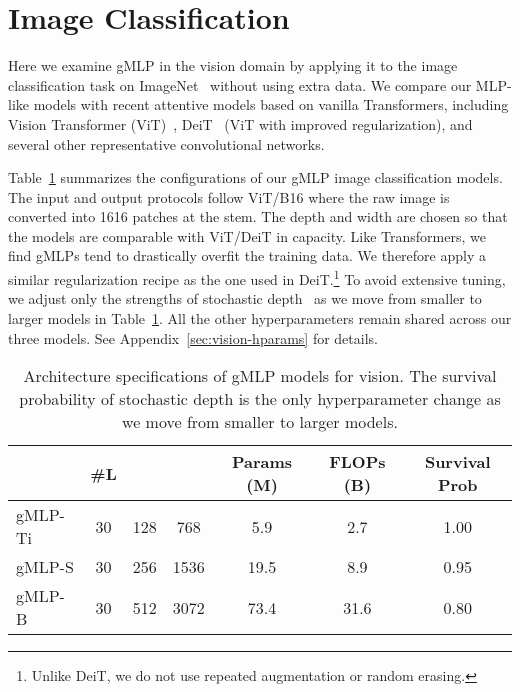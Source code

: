\documentclass{article}
\newcommand{\gffn}{gMLP\xspace}
\begin{document}
\FloatBarrier
\section{Image Classification}
\label{sec:vision}
Here we examine \gffn in the vision domain by applying it to the image classification task on ImageNet~\cite{deng2009imagenet} without using extra data.
We compare our MLP-like models with recent attentive models based on vanilla Transformers, including Vision Transformer (ViT)~\cite{dosovitskiy2020image}, DeiT~\cite{touvron2020training} (ViT with improved regularization),
and several other representative convolutional networks.

Table~\ref{tab:vision-configs} summarizes the configurations of our \gffn image classification models. The input and output protocols follow ViT/B16 where the raw image is converted into 1616 patches at the stem. The depth and width are chosen so that the models are comparable with ViT/DeiT in capacity.
Like Transformers,
we find \gffn{s} tend to drastically overfit the training data.
We therefore apply a similar regularization recipe as the one used in DeiT.\footnote{Unlike DeiT, we do not use repeated augmentation or random erasing.}
To avoid extensive tuning, we adjust only the strengths of stochastic depth~\cite{huang2016deep} as we move from smaller to larger models in Table~\ref{tab:vision-configs}.
All the other hyperparameters remain shared across our three models.
See Appendix~\ref{sec:vision-hparams} for details.
\begin{table}[h]
\centering
\small
\caption{Architecture specifications of \gffn models for vision. The survival probability of stochastic depth is the only hyperparameter change as we move from smaller to larger models.}
\begin{tabular}{@{}l|ccc|cc|c@{}}
\toprule
\multicolumn{1}{c}{} & \#L &  &  & Params (M) & FLOPs (B) & Survival Prob \\ \midrule
\gffn-Ti & 30 & 128 & 768 & 5.9 & 2.7 & 1.00 \\
\gffn-S & 30 & 256 & 1536 & 19.5 & 8.9 & 0.95 \\
\gffn-B & 30 & 512 & 3072 & 73.4 & 31.6 & 0.80 \\ \bottomrule
\end{tabular}
\label{tab:vision-configs}
\end{table}
\vspace{-0.3cm}
\end{document}
